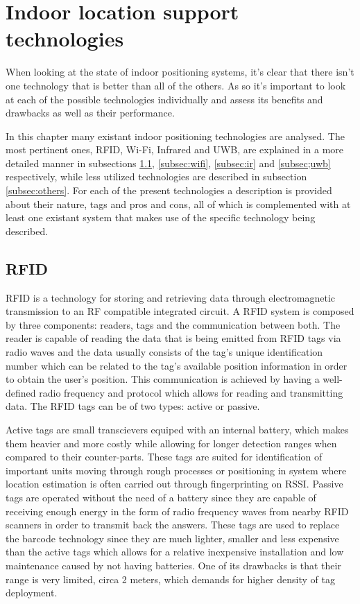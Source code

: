 \section{Indoor location support technologies}
\label{sec:indoortech}

When looking at the state of indoor positioning systems, it's clear that there isn't one technology that is better than all of the others. As so it's important to look at each of the possible technologies individually and assess its benefits and drawbacks as well as their performance.

In this chapter many existant indoor positioning technologies are analysed. The most pertinent ones, RFID, Wi-Fi, Infrared and UWB, are explained in a more detailed manner in subsections \ref{subsec:rfid}, \ref{subsec:wifi}, \ref{subsec:ir} and \ref{subsec;uwb} respectively, while less utilized technologies are described in subsection \ref{subsec:others}. For each of the present technologies a description is provided about their nature, tags and pros and cons, all of which is complemented with at least one existant system that makes use of the specific technology being described. 


\subsection{RFID}
\label{subsec:rfid}

\ac{RFID} is a technology for storing and retrieving data through electromagnetic transmission to an RF compatible integrated circuit. A \ac{RFID} system is composed by three components: readers, tags and the communication between both. The reader is capable of reading the data that is being emitted from \ac{RFID} tags via radio waves and the data usually consists of the tag's unique identification number which can be related to the tag's available position information in order to obtain the user's position. This communication is achieved by having a well-defined radio frequency and protocol which allows for reading and transmitting data. The \ac{RFID} tags can be of two types: active or passive.

Active tags are small transcievers equiped with an internal battery, which makes them heavier and more costly while allowing for longer detection ranges when compared to their counter-parts. These tags are suited for identification of important units moving through rough processes or positioning in system where location estimation is often carried out through fingerprinting on \ac{RSSI}.
Passive tags are operated without the need of a battery since they are capable of receiving enough energy in the form of radio frequency waves from nearby \ac{RFID} scanners in order to transmit back the answers. These tags are used to replace the barcode technology since they are much lighter, smaller and less expensive than the active tags which allows for a relative inexpensive installation and low maintenance caused by not having batteries. One of its drawbacks is that their range is very limited, circa 2 meters, which demands for higher density of tag deployment.

